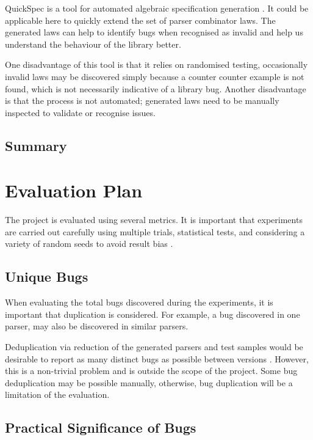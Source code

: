 \documentclass[11pt]{article}
\begin{document}
QuickSpec is a tool for automated algebraic specification generation \cite{quickspec}. It could be applicable here to quickly extend the set of parser combinator laws. The generated laws can help to identify bugs when recognised as invalid and help us understand the behaviour of the library better.

One disadvantage of this tool is that it relies on randomised testing, occasionally invalid laws may be discovered simply because a counter counter example is not found, which is not necessarily indicative of a library bug. Another disadvantage is that the process is not automated; generated laws need to be manually inspected to validate or recognise issues.

\subsection{Summary}

\section{Evaluation Plan} %

The project is evaluated using several metrics. It is important that experiments are carried out carefully using multiple trials, statistical tests, and considering a variety of random seeds to avoid result bias \cite{evaluation}.

\subsection{Unique Bugs}

When evaluating the total bugs discovered during the experiments, it is important that duplication is considered. For example, a bug discovered in one parser, may also be discovered in similar parsers.

Deduplication via reduction of the generated parsers and test samples would be desirable to report as many distinct bugs as possible between versions \cite{deduplication}. However, this is a non-trivial problem and is outside the scope of the project. Some bug deduplication may be possible manually, otherwise, bug duplication will be a limitation of the evaluation.

\subsection{Practical Significance of Bugs}
\end{document}
